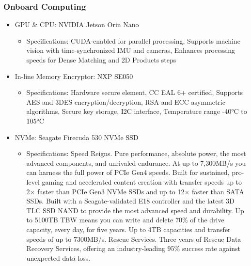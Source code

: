 \subsubsection{Onboard Computing}
\begin{itemize}
    \item GPU \& CPU: NVIDIA Jetson Orin Nano
    \begin{itemize}
        \item Specifications: CUDA-enabled for parallel processing, Supports machine vision with time-synchronized IMU and cameras, Enhances processing speeds for Dense Matching and 2D Products steps
    \end{itemize}
    \item In-line Memory Encryptor: NXP SE050
    \begin{itemize}
        \item Specifications: Hardware secure element, CC EAL 6+ certified, Supports AES and 3DES encryption/decryption, RSA and ECC asymmetric algorithms, Secure key storage, I2C interface, Temperature range -40°C to 105°C
    \end{itemize}
    \item NVMe: Seagate Firecuda 530 NVMe SSD
    \begin{itemize}
        \item Specifications: Speed Reigns. Pure performance, absolute power, the most advanced components, and unrivaled endurance. At up to 7,300MB/s you can harness the full power of PCIe Gen4 speeds. Built for sustained, pro-level gaming and accelerated content creation with transfer speeds up to 2× faster than PCIe Gen3 NVMe SSDs and up to 12× faster than SATA SSDs. Built with a Seagate-validated E18 controller and the latest 3D TLC SSD NAND to provide the most advanced speed and durability. Up to 5100TB TBW means you can write and delete 70\% of the drive capacity, every day, for five years. Up to 4TB capacities and transfer speeds of up to 7300MB/s. Rescue Services. Three years of Rescue Data Recovery Services, offering an industry-leading 95\% success rate against unexpected data loss.
    \end{itemize}
\end{itemize}

